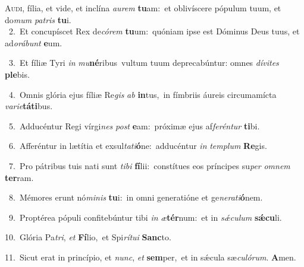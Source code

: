\lettrine{\initial\textcolor{\initialcolor}{A}}{udi,} fília, et vide, et inclína \textit{au}\-\textit{rem} \textbf{tu}\-am:~\star et oblivíscere pópulum tuum, et do\textit{mum} \textit{pa}\-\textit{tris} \textbf{tu}\-i.\\
{\numbfont\textcolor{\numbcolor}{~2.}}~Et concupíscet Rex de\-\textit{có}\-\textit{rem} \textbf{tu}\-um:~\star quóniam ipse est Dóminus Deus tuus, et ad\-\textit{o}\-\textit{rá}\textit{bunt} \textbf{e}\-um.\par
{\numbfont\textcolor{\numbcolor}{~3.}}~Et fíliæ Tyri \textit{in} \textit{mu}\-\textbf{né}ribus~\star vultum tuum deprecabúntur: omnes \textit{dí}\-\textit{vi}\textit{tes} \textbf{ple}\-bis.\par
{\numbfont\textcolor{\numbcolor}{~4.}}~Omnis glória ejus fíliæ Re\textit{gis} \textit{ab} \textbf{in}\-tus,~\star in fímbriis áureis circumamícta \textit{va}\-\textit{ri}\textit{e}\textbf{tá}\textbf{ti}bus.\par
{\numbfont\textcolor{\numbcolor}{~5.}}~Adducéntur Regi vírgi\textit{nes} \textit{post} \textbf{e}\-am:~\star próximæ ejus af\-\textit{fe}\-\textit{rén}\textit{tur} \textbf{ti}\-bi.\par
{\numbfont\textcolor{\numbcolor}{~6.}}~Afferéntur in lætítia et exsul\-\textit{ta}\-\textit{ti}\textbf{ó}ne:~\star adducéntur \textit{in} \textit{tem}\-\textit{plum} \textbf{Re}\-gis.\par
{\numbfont\textcolor{\numbcolor}{~7.}}~Pro pátribus tuis nati sunt \textit{ti}\-\textit{bi} \textbf{fí}\-lii:~\star constítues eos príncipes su\textit{per} \textit{om}\-\textit{nem} \textbf{ter}\-ram.\par
{\numbfont\textcolor{\numbcolor}{~8.}}~Mémores erunt nó\-\textit{mi}\-\textit{nis} \textbf{tu}\-i:~\star in omni generatióne et ge\-\textit{ne}\-\textit{ra}\textit{ti}\textbf{ó}nem.\par
{\numbfont\textcolor{\numbcolor}{~9.}}~Proptérea pópuli confitebúntur tibi \textit{in} \textit{æ}\-\textbf{tér}num:~\star et in \textit{sǽ}\-\textit{cu}\textit{lum} \textbf{sǽ}\-\textbf{cu}li.\par
{\numbfont\textcolor{\numbcolor}{10.}}~Glória Pa\-\textit{tri}\-, \textit{et} \textbf{Fí}\-lio,~\star et Spi\-\textit{rí}\-\textit{tu}\textit{i} \textbf{Sanc}\-to.\par
{\numbfont\textcolor{\numbcolor}{11.}}~Sicut erat in princípio, et \textit{nunc}\-, \textit{et} \textbf{sem}\-per,~\star et in sǽcula sæ\-\textit{cu}\-\textit{ló}\textit{rum}. \textbf{A}\-men.\par
